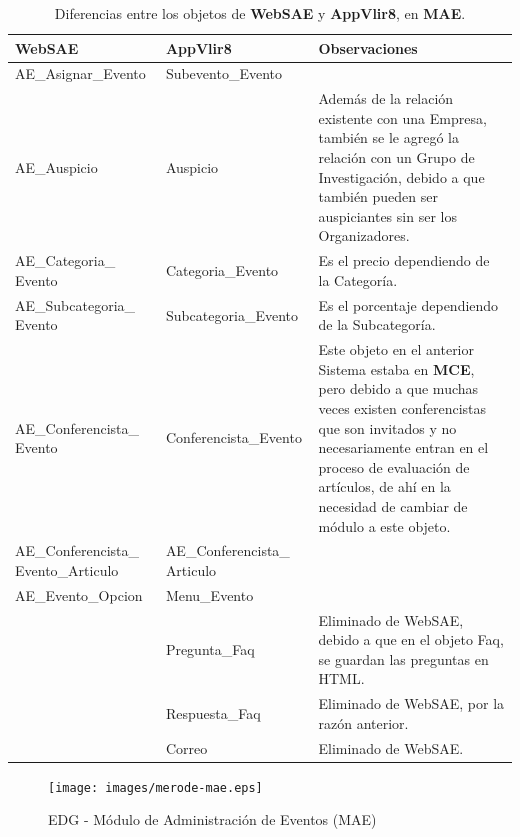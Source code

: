 \begin{indentar}
\begin{table}
	\begin{center}
	\begin{tabular}{|p{1.5in}|p{1.5in}|p{1.8in}|}
		\hline
		\textbf{WebSAE} & \textbf{AppVlir8} & \textbf{Observaciones} \\
		\hline\hline
			AE\_Asignar\_Evento & Subevento\_Evento &  \\
		\hline
		  	AE\_Auspicio 		& Auspicio & Adem\'as de la relaci\'on existente con una Empresa, tambi\'en se le agreg\'o la relaci\'on con un Grupo de Investigaci\'on, debido a que tambi\'en pueden ser auspiciantes sin ser los Organizadores. \\
		\hline
		  	AE\_Categoria\_ Evento		& Categoria\_Evento & Es el precio dependiendo de la Categor\'ia. \\
		\hline
		  	AE\_Subcategoria\_ Evento	& Subcategoria\_Evento & Es el porcentaje dependiendo de la Subcategor\'ia. \\
		\hline
		  	AE\_Conferencista\_ Evento	& Conferencista\_Evento & Este objeto en el anterior Sistema estaba en \textbf{MCE}, pero debido a que muchas veces existen conferencistas que son invitados y no necesariamente entran en el proceso de evaluaci\'on de art\'iculos, de ah\'i en la necesidad de cambiar de m\'odulo a este objeto. \\
		\hline
		  	AE\_Conferencista\_ Evento\_Articulo	& AE\_Conferencista\_ Articulo &  \\
		\hline
		  	AE\_Evento\_Opcion						& Menu\_Evento &  \\
		\hline
		  	 & Pregunta\_Faq & Eliminado de WebSAE, debido a que en el objeto Faq, se guardan las preguntas en HTML. \\
		\hline
		  	 & Respuesta\_Faq & Eliminado de WebSAE, por la raz\'on anterior. \\
		\hline
		  	 & Correo & Eliminado de WebSAE. \\
		\hline
	\end{tabular}
	\caption{Diferencias entre los objetos de \textbf{WebSAE} y \textbf{AppVlir8}, en \textbf{MAE}.}\label{diferencias:websae-appvlir8-mae}
	\end{center}
\end{table}

\begin{landscape}
\begin{figure}
  \centering
    {\texttt{[image: images/merode-mae.eps]}}
  \caption{EDG - M\'odulo de Administraci\'on de Eventos (MAE)}
  \label{edg:mae}
\end{figure}
\end{landscape}


\end{indentar}

